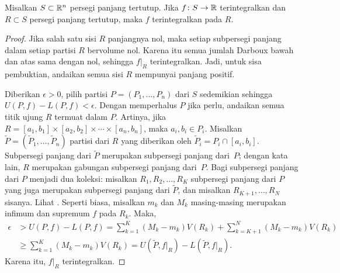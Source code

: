 \begin{prop} \label{mv:prop:integralsmallerset}
Misalkan $S \subset {\mathbb{R}}^n$ persegi panjang tertutup. Jika
$f \colon S \to {\mathbb{R}}$ terintegralkan dan $R \subset S$ persegi panjang tertutup,
maka $f$ terintegralkan pada $R$.
\end{prop}

\begin{proof}
Jika salah satu sisi $R$ panjangnya nol, maka setiap subpersegi panjang dalam
setiap partisi $R$ bervolume nol. Karena itu semua jumlah Darboux bawah dan atas
sama dengan nol, sehingga $f|_R$ terintegralkan. Jadi, untuk sisa pembuktian,
andaikan semua sisi $R$ mempunyai panjang positif.

Diberikan $\epsilon > 0$, pilih partisi $P=(P_1,\ldots,P_n)$ dari $S$
sedemikian sehingga $U(P,f)-L(P,f) < \epsilon$. Dengan memperhalus $P$ jika
perlu, andaikan semua titik ujung $R$ termuat dalam $P$. Artinya, jika
$R = [a_1,b_1] \times [a_2,b_2] \times \cdots \times [a_n,b_n]$, maka
$a_i,b_i \in P_i$.
Misalkan $\widetilde{P} = (\widetilde{P}_1,\ldots,\widetilde{P}_n)$ partisi dari
$R$ yang diberikan oleh $\widetilde{P}_i = P_i \cap [a_i,b_i]$.
Subpersegi panjang dari $\widetilde{P}$ merupakan subpersegi panjang dari~$P$;
dengan kata lain, $R$ merupakan gabungan subpersegi panjang dari~$P$.
Bagi subpersegi panjang dari $P$ menjadi dua koleksi: misalkan
$R_1,R_2,\ldots,R_K$ subpersegi panjang dari $P$ yang juga merupakan
subpersegi panjang dari $\widetilde{P}$, dan misalkan
$R_{K+1},\ldots,R_N$ sisanya. Lihat .
Seperti biasa, misalkan $m_k$ dan $M_k$ masing-masing merupakan infimum dan
supremum $f$ pada $R_k$. Maka,
\begin{equation*}
\begin{split}
\epsilon & > 
U(P,f)-L(P,f)
=
\sum_{k=1}^K (M_k-m_k) V(R_k)
+
\sum_{k=K+1}^N (M_k-m_k) V(R_k)
\\
&
\geq
\sum_{k=1}^K (M_k-m_k) V(R_k)
=
U(\widetilde{P},f|_R)-L(\widetilde{P},f|_R) .
\end{split}
\end{equation*}
Karena itu, $f|_R$ terintegralkan.
\end{proof}
\begin{myfigureht}
\caption{Partisi persegi panjang besar $S$ yang juga menghasilkan partisi
persegi panjang lebih kecil (diarsir dan diberi garis tepi) $R \subset S$.
Subpersegi panjang $R_1,R_2,R_3,R_4$ merupakan subpersegi panjang dari
$\widetilde{P} = \bigl( \{ x_{1,1}, x_{1,2} , x_{1,3} \} ,
\{ x_{2,1}, x_{2,2} , x_{2,3} \} \bigr)$.\label{fig:figrectsubrect}}
\end{myfigureht}

